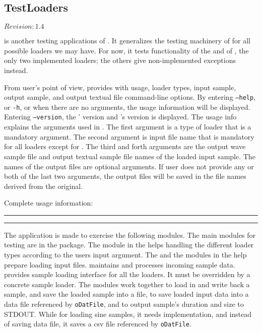 \subsection{TestLoaders}

$Revision: 1.4 $

 is another testing applications of {\marf}.
It generalizes the testing machinery of  for 
all possible loaders we may have. For now, it tests functionality of
the  and  of {\marf}, the only two
implemented loaders; the others give non-implemented exceptions instead. 

From user's point of view,  provides with usage, loader types, input sample, output
sample, and output textual file command-line options.
By entering \texttt{--help}, or \texttt{-h}, or when there are no arguments, the usage information will be displayed.
Entering \texttt{--version}, the ' version and {\marf}'s version is displayed.
The usage info explains the arguments used in .
The first argument is a type of loader that is a mandatory argument.
The second argument is input file name that is mandatory for all loaders except for .
The third and forth arguments are the output wave sample file and output textual sample file names of the loaded 
input sample. The names of the output files are optional arguments. If user does not provide any or both of
the last two arguments, the output files will be saved in the file names derived from the original.

\noindent
Complete usage information:

\vspace{15pt}
\hrule

\hrule
\vspace{15pt}

The application is made to exercise the following {\marf} modules.
The main modules for testing are in the  package.
The  module in the  helps handling the different loader types according
to the users input argument. The  and the  modules in the  help  
prepare loading input files.  maintains and processes incoming sample data. 
provides sample loading interface for all the {\marf} loaders. It must be overridden by a concrete sample loader.
The modules work together to load in and write back a sample,
and save the loaded sample into a file, to save loaded input data into a data file referenced by \texttt{oDatFile}, 
and to output sample's duration and size to STDOUT. While for loading sine samples, it needs  implementation,
and instead of saving data file, it saves a csv file referenced by \texttt{oDatFile}.

